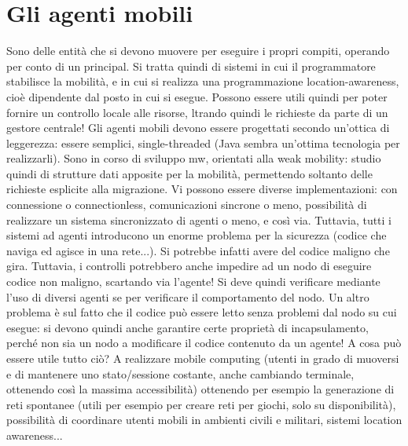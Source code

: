 \section{Gli agenti mobili}
Sono delle entità che si devono muovere per eseguire i propri compiti, operando per conto di un principal. Si tratta
quindi di sistemi in cui il programmatore stabilisce la mobilità, e in cui si realizza una programmazione
location-awareness, cioè dipendente dal posto in cui si esegue. Possono essere utili quindi per poter fornire un
controllo locale alle risorse, ltrando quindi le richieste da parte di un gestore centrale! Gli agenti mobili devono
essere progettati secondo un'ottica di leggerezza: essere semplici, single-threaded (Java sembra un'ottima tecnologia
per realizzarli). Sono in corso di sviluppo mw, orientati alla weak mobility:
studio quindi di strutture dati apposite per la mobilità, permettendo soltanto delle richieste esplicite alla
migrazione.
Vi possono essere diverse implementazioni: con connessione o connectionless, comunicazioni sincrone o meno, possibilità
di realizzare un sistema sincronizzato di agenti o meno, e così via. Tuttavia, tutti i sistemi ad agenti introducono un
enorme problema per la sicurezza (codice che naviga ed agisce in una rete...). Si potrebbe infatti avere del codice
maligno che gira. Tuttavia, i controlli potrebbero anche impedire ad un nodo di eseguire codice non maligno, scartando
via l'agente! Si deve quindi verificare mediante l'uso di diversi agenti se per verificare il comportamento del nodo.
Un altro problema è sul fatto che il codice può essere letto senza problemi dal nodo su cui esegue: si devono quindi
anche garantire certe proprietà di incapsulamento, perché non sia un nodo a modificare il codice contenuto da un agente!
A cosa può essere utile tutto ciò? A realizzare mobile computing (utenti in grado di muoversi e di mantenere uno
stato/sessione costante, anche cambiando terminale, ottenendo così la massima accessibilità) ottenendo per esempio la
generazione di reti spontanee (utili per esempio per creare reti per giochi, solo su disponibilità), possibilità di
coordinare utenti mobili in ambienti civili e militari, sistemi location awareness...